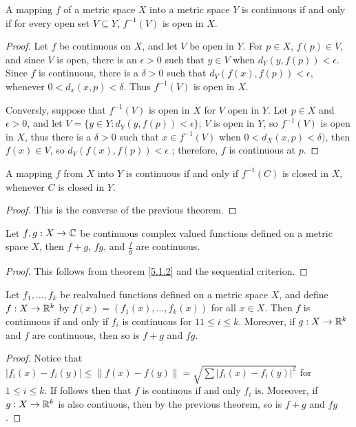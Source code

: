 \begin{theorem}\label{5.2.3}
    A mapping $f$ of a metric space  $X$ into a metric space  $Y$ is continuous if and
    only if  for every open set $V \subseteq Y$,  $f^{-1}(V)$ is open in  $X$.
\end{theorem}
\begin{proof}
    Let $f$ be continuous on  $X$, and let  $V$ be open in  $Y$. For  $p \in X$, $f(p) \in V$,
    and since  $V$ is open, there is an  $\epsilon>0$ such that  $y \in V$ when $d_Y(y,f(p))<\epsilon$.
    Since  $f$ is continuous, there is a  $\delta>0$ such that  $d_Y(f(x),f(p))<\epsilon$, whenever
    $0<d_x(x,p)<\delta$. Thus  $f^{-1}(V)$ is open in  $X$.

    Conversly, suppose that $f^{-1}(V)$ is open in  $X$ for  $V$ open in  $Y$. Let
    $p \in X$ and  $\epsilon>0$, and let  $V=\{y \in Y: d_Y(y,f(p))<\epsilon\}$;  $V$ is open in  $Y$,
    so  $f^{-1}(V)$ is open in  $X$, thus there is a  $\delta>0$ such that $x \in f^{-1}(V)$ when
    $0<d_X(x,p)<\delta)$, then $f(x) \in V$, so $d_Y(f(x),f(p))<\epsilon$ ; therefore, $f$ is continuous
    at  $p$.
\end{proof}

\begin{corollary}
    A mapping $f$ from  $X$ into  $Y$ is continuous if and only if  $f^{-1}(C)$ is closed
    in $X$, whenever  $C$ is closed in  $Y$.
\end{corollary}
\begin{proof}
    This is the converse of the previous theorem.
\end{proof}

\begin{theorem}\label{5.2.4}
    Let $f,g:X \rightarrow \mathbb{C}$ be continuous complex valued functions defined on a
    metric space  $X$, then $f+g$, $fg$, and $\frac{f}{g}$ are continuous.
\end{theorem}
\begin{proof}
    This follows from theorem \ref{5.1.2} and the sequential criterion.
\end{proof}

\begin{theorem}\label{5.2.5}
    Let $f_1, \dots, f_k$ be realvalued functions defined on a metric space $X$, and define
    $f:X \rightarrow \mathbb{R}^k$ by  $f(x)=(f_1(x), \dots, f_k(x))$ for all $x \in X$. Then $f$ is continuous
    if and only if  $f_i$ is continuous for  $11 \leq i \leq k$. Moreover, if  $g:X \rightarrow \mathbb{R}^k$ and
     $f$ are continuous, then so is  $f+g$ and  $fg$.
\end{theorem}
\begin{proof}
    Notice that $|f_i(x)-f_i(y)| \leq \|f(x)-f(y)\|=\sqrt{\sum{|f_i(x)-f_i(y)|^2}}$	for
    $1 \leq i \leq k$. If follows then that  $f$ is contiuous if and only  $f_i$ is. Moreover,
    if  $g:X \rightarrow \mathbb{R}^k$  is also contiuous, then by the previous theorem, so is $f+g$ and  $fg$.
\end{proof}

